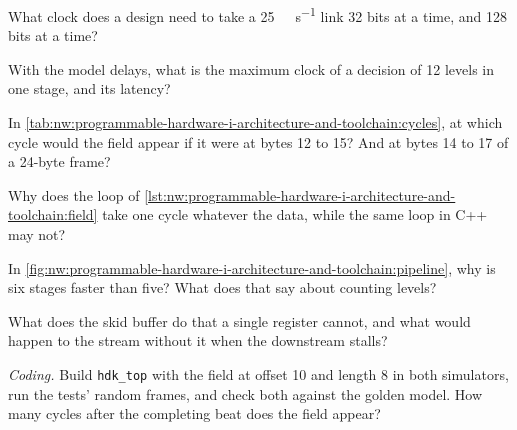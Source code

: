 \begin{exercise}[$\star$]\label{exo:nw:programmable-hardware-i-architecture-and-toolchain:1}
What clock does a design need to take a \qty{25}{\giga\bit\per\second} link 32 bits at a time, and 128 bits at a time?
\end{exercise}

\begin{exercise}[$\star$]\label{exo:nw:programmable-hardware-i-architecture-and-toolchain:2}
With the model delays, what is the maximum clock of a decision of 12 levels in one stage, and its latency?
\end{exercise}

\begin{exercise}[$\star$]\label{exo:nw:programmable-hardware-i-architecture-and-toolchain:3}
In \cref{tab:nw:programmable-hardware-i-architecture-and-toolchain:cycles}, at which cycle would the field appear if it were at bytes 12 to
15? And at bytes 14 to 17 of a 24-byte frame?
\end{exercise}

\begin{exercise}[$\star\star$]\label{exo:nw:programmable-hardware-i-architecture-and-toolchain:4}
Why does the loop of \cref{lst:nw:programmable-hardware-i-architecture-and-toolchain:field} take one cycle whatever the data, while the same
loop in C++ may not?
\end{exercise}

\begin{exercise}[$\star\star$]\label{exo:nw:programmable-hardware-i-architecture-and-toolchain:5}
In \cref{fig:nw:programmable-hardware-i-architecture-and-toolchain:pipeline}, why is six stages faster than five? What does that say about
counting levels?
\end{exercise}

\begin{exercise}[$\star\star$]\label{exo:nw:programmable-hardware-i-architecture-and-toolchain:6}
What does the skid buffer do that a single register cannot, and what would happen to the stream without it when the downstream stalls?
\end{exercise}

\begin{exercise}[$\star\star\star$]\label{exo:nw:programmable-hardware-i-architecture-and-toolchain:7}
\emph{Coding.} Build \texttt{hdk\_top} with the field at offset 10 and length 8 in both simulators, run the tests' random frames, and check
both against the golden model. How many cycles after the completing beat does the field appear?
\end{exercise}

